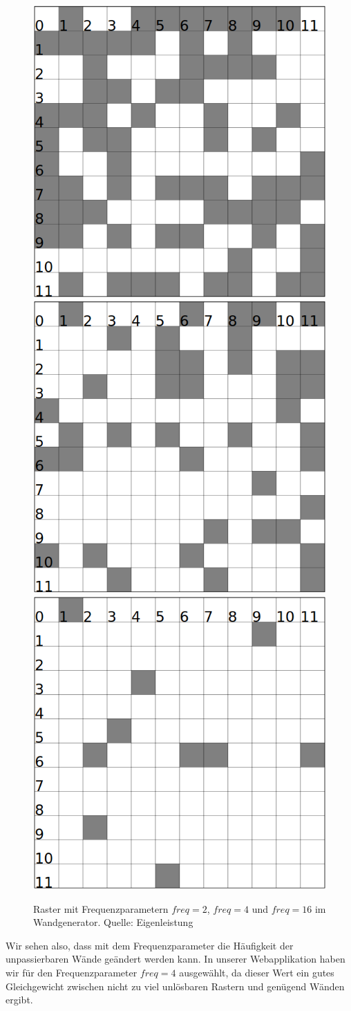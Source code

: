 \documentclass[12pt,a4paper,german]{report}
\begin{document}
\begin{figure}[H]
  \centering
  \includegraphics[width=.3\linewidth]{freq_for_2}
  \quad
  \includegraphics[width=.3\linewidth]{freq_for_4}
  \quad
  \includegraphics[width=.3\linewidth]{freq_for_16}\\
  \caption[Raster mit Frequenzparametern $freq = 2$, $freq = 4$ und $freq = 16$ im Wandgenerator.]{Raster mit Frequenzparametern $freq = 2$, $freq = 4$ und $freq = 16$ im Wandgenerator. Quelle: Eigenleistung}
  \label{fig:freq_param}
\end{figure}
Wir sehen also, dass mit dem Frequenzparameter die Häufigkeit der unpassierbaren Wände geändert werden kann. In unserer Webapplikation haben wir für den Frequenzparameter $freq = 4$ ausgewählt, da dieser Wert ein gutes Gleichgewicht zwischen nicht zu viel unlösbaren Rastern und genügend Wänden ergibt.
\end{document}
